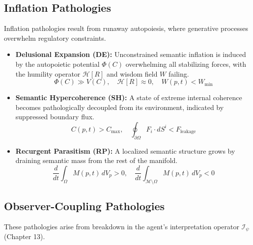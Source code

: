 \subsection{Inflation Pathologies}

Inflation pathologies result from runaway autopoiesis, where generative processes overwhelm regulatory constraints.

\begin{itemize}
    \item \textbf{Delusional Expansion (DE):} Unconstrained semantic inflation is induced by the autopoietic potential \(\Phi(C)\) overwhelming all stabilizing forces, with the humility operator \(\mathcal{H}[R]\) and wisdom field \(W\) failing.
    \begin{equation}
    \Phi(C) \gg V(C), \quad \mathcal{H}[R] \approx 0, \quad W(p,t) < W_{\text{min}}
    \end{equation}

    \item \textbf{Semantic Hypercoherence (SH):} A state of extreme internal coherence becomes pathologically decoupled from its environment, indicated by suppressed boundary flux.
    \begin{equation}
    C(p,t) > C_{\text{max}}, \quad \oint_{\partial \Omega} F_i \cdot dS^i < F_{\text{leakage}}
    \end{equation}

    \item \textbf{Recurgent Parasitism (RP):} A localized semantic structure grows by draining semantic mass from the rest of the manifold.
    \begin{equation}
    \frac{d}{dt}\int_{\Omega} M(p,t) \, dV_p > 0, \quad \frac{d}{dt}\int_{\mathcal{M}\setminus\Omega} M(p,t) \, dV_p < 0
    \end{equation}
\end{itemize}

\subsection{Observer-Coupling Pathologies}

These pathologies arise from breakdown in the agent's interpretation operator \(\mathcal{I}_{\psi}\) (Chapter 13).

